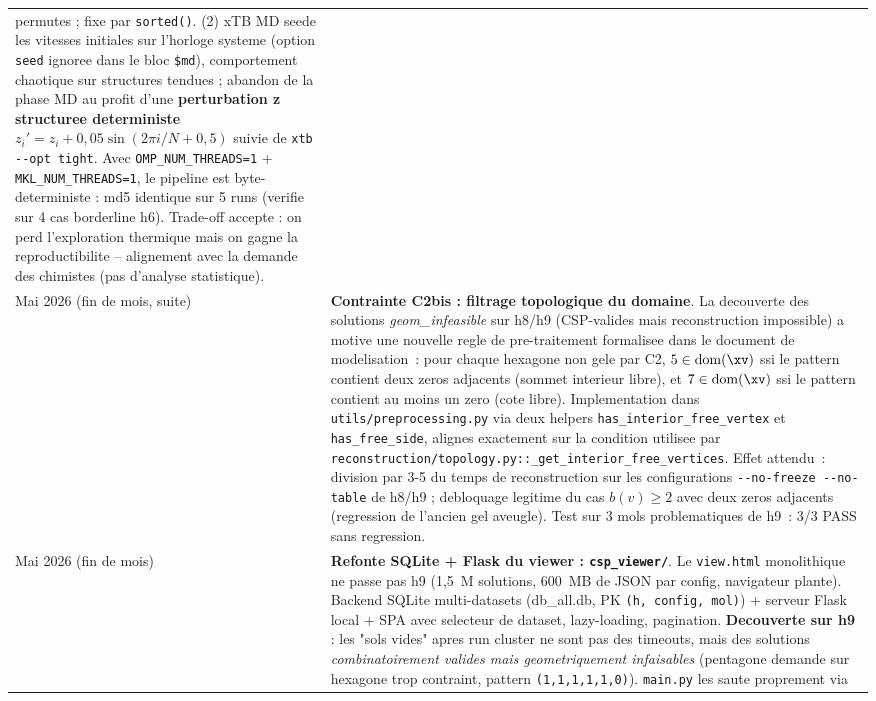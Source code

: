 \begin{center}
\begin{tabular}{lp{11cm}}
    permutes ; fixe par \texttt{sorted()}. (2) xTB MD seede les vitesses
    initiales sur l'horloge systeme (option \texttt{seed} ignoree dans le
    bloc \texttt{\$md}), comportement chaotique sur structures tendues ;
    abandon de la phase MD au profit d'une \textbf{perturbation z structuree
    deterministe} \(z_i' = z_i + 0{,}05\sin(2\pi i / N + 0{,}5)\) suivie de
    \texttt{xtb -{}-opt tight}. Avec \texttt{OMP\_NUM\_THREADS=1} +
    \texttt{MKL\_NUM\_THREADS=1}, le pipeline est byte-deterministe : md5 identique
    sur 5 runs (verifie sur 4 cas borderline h6). Trade-off accepte : on perd
    l'exploration thermique mais on gagne la reproductibilite -- alignement
    avec la demande des chimistes (pas d'analyse statistique). \\
  Mai 2026 (fin de mois, suite) &
    \textbf{Contrainte C2bis : filtrage topologique du domaine}.
    La decouverte des solutions \emph{geom\_infeasible} sur h8/h9 (CSP-valides
    mais reconstruction impossible) a motive une nouvelle regle de
    pre-traitement formalisee dans le document de modelisation~: pour
    chaque hexagone non gele par C2, $5 \in \mathrm{dom}(\xv)$ ssi le
    pattern contient deux zeros adjacents (sommet interieur libre), et
    $7 \in \mathrm{dom}(\xv)$ ssi le pattern contient au moins un zero
    (cote libre). Implementation dans \texttt{utils/preprocessing.py} via
    deux helpers \texttt{has\_interior\_free\_vertex} et
    \texttt{has\_free\_side}, alignes exactement sur la condition utilisee
    par \texttt{reconstruction/topology.py::\_get\_interior\_free\_vertices}.
    Effet attendu~: division par 3-5 du temps de reconstruction sur les
    configurations \texttt{-{}-no-freeze -{}-no-table} de h8/h9 ; debloquage
    legitime du cas $b(v) \geq 2$ avec deux zeros adjacents (regression
    de l'ancien gel aveugle). Test sur 3 mols problematiques de h9~: 3/3
    PASS sans regression. \\
  Mai 2026 (fin de mois) &
    \textbf{Refonte SQLite + Flask du viewer : \texttt{csp\_viewer/}}. Le
    \texttt{view.html} monolithique ne passe pas h9 (1{,}5~M solutions, 600~MB
    de JSON par config, navigateur plante). Backend SQLite multi-datasets
    (db\_all.db, PK \texttt{(h, config, mol)}) + serveur Flask local + SPA
    avec selecteur de dataset, lazy-loading, pagination. \textbf{Decouverte
    sur h9} : les "sols vides" apres run cluster ne sont pas des timeouts,
    mais des solutions \emph{combinatoirement valides mais geometriquement
    infaisables} (pentagone demande sur hexagone trop contraint, pattern
    \texttt{(1,1,1,1,1,0)}). \texttt{main.py} les saute proprement via

\end{tabular}
\end{center}
